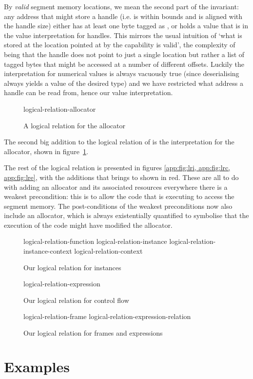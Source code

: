 \documentclass[acmsmall,screen]{acmart}\settopmatter{}
\begin{document}
By \emph{valid} segment memory locations, we mean the second part of the invariant: any address that might store a handle (i.e. is within bounds and is aligned with the handle size) either has at least one byte tagged as \xxWNumeric, or holds a value that is in the value interpretation for handles. This mirrors the usual intuition of `what is stored at the location pointed at by the capability is valid', the complexity of \mswasm being that the handle does not point to just a single location but rather a list of tagged bytes that might be accessed at a number of different offsets. Luckily the interpretation for numerical values is always vacuously true (since deserialising always yields a value of the desired type) and we have restricted what address a handle can be read from, hence our value interpretation.

\begin{figure}[t]
  {logical-relation-allocator}
  \label{app:fig:lra}
  \caption{A logical relation for the allocator}
\end{figure}

The second big addition to the logical relation of \iriswasm is the interpretation for the allocator, shown in figure~\ref{app:fig:lra}. 

The rest of the logical relation is presented in figures \ref{app:fig:lri, app:fig:lrc, app:fig:lre}, with the additions that \irismswasm brings to \iriswasm shown in red. These are all to do with adding an allocator and its associated resources everywhere there is a weakest precondition: this is to allow the code that is executing to access the segment memory. The post-conditions of the weakest preconditions now also include an allocator, which is always existentially quantified to symbolise that the execution of the code might have modified the allocator.

\begin{figure}[t]
  {logical-relation-function}
  {logical-relation-instance}
  {logical-relation-instance-context}
  {logical-relation-context}
\label{app:fig:lri}
\caption{Our logical relation for instances}
\end{figure}

\begin{figure}[t]
  {logical-relation-expression}
\label{app:fig:lrc}
\caption{Our logical relation for control flow}
\end{figure}

\begin{figure}[t]
{logical-relation-frame}
{logical-relation-expression-relation}
\label{app:fig:lre}
\caption{Our logical relation for frames and expressions}
\end{figure}


\section{Examples}





\end{document}
